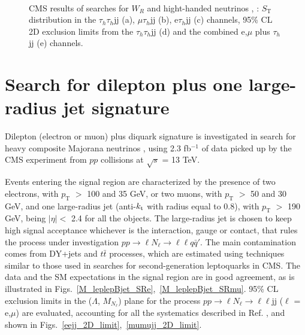 \documentclass[10pt]{article}
\begin{document}
\vspace{-0.4cm}
\begin{figure}[h!]
\hspace{0.15cm}
\
\hspace{0.15cm}
\hspace{0.15cm}
\hspace{0.15cm}
\vspace{-0.35cm}
\caption{
CMS results of searches for $W_R$ and hight-handed neutrinos \cite{LQ3015_CMS}, \cite{LQ3016_CMS}: $S_\mathrm{T}$ distribution in the $\tau_h\tau_h$jj (a), $\mu \tau_h$jj (b), e$\tau_h$jj (c) channels,
95\% CL 2D exclusion limits from the $\tau_h \tau_h$jj (d) and the combined e,$\mu$ plus  $\tau_h$jj (e) channels.}
\label{some example}
\end{figure}

\vspace{0.5cm}
\section{Search for dilepton plus one large-radius jet signature}
\vspace{-0.15cm}
Dilepton (electron or muon) plus diquark signature is investigated in search for heavy composite Majorana neutrinos \cite{HCMN_CMS},
using 2.3 fb$^{-1}$ of data picked up by the CMS experiment from $pp$ collisions at $\sqrt{s}$ = 13 TeV.

Events entering the signal region are characterized by the presence of two electrons, with $p_\mathrm{T}$ $>$ 100 and 35 GeV, 
or two muons, with $p_\mathrm{T}$ $>$ 50 and 30 GeV, and one large-radius jet (anti-$k_{\rm t}$ \cite{Cacciari:2008gp} with radius equal to 0.8), with $p_\mathrm{T}$ $>$ 190 GeV, being $|\eta| <$ 2.4 for all the objects.
The large-radius jet is chosen to keep high signal acceptance whichever is the interaction, gauge or contact, that rules the process under investigation $pp \rightarrow \ell N_{\ell} \rightarrow \ell\ell q \bar{q}'$.
The main contamination comes from DY+jets and $t\bar{t}$ processes, which are estimated using techniques similar to those used in searches for second-generation leptoquarks in CMS.
The data and the SM expectations in the signal region are in good agreement, as is illustrated in Figs.~\ref{M_leplepBjet_SRe},~\ref{M_leplepBjet_SRmu}.
95\% CL exclusion limits in the ($\Lambda$, $M_{N_{\ell}}$) plane for the process $pp \rightarrow \ell N_{\ell} \rightarrow \ell \ell$jj ($\ell$ = e,$\mu$) are evaluated,
accounting for all the systematics described in Ref. \cite{HCMN_CMS}, and shown in Figs.~\ref{eejj_2D_limit},~\ref{mumujj_2D_limit}.
\end{document}
